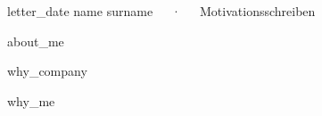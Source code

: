 \documentclass[11pt, a4paper]{awesome-cv}
\begin{document}
\makecvheader[R]

\makecvfooter
  {{{letter_date}}}
  {{{name}} {{surname}}~~~·~~~Motivationsschreiben}
  {}

\makelettertitle

\begin{cvletter}

{{about_me}}

{{why_company}}

{{why_me}}

\end{cvletter}


\makeletterclosing
\end{document}
